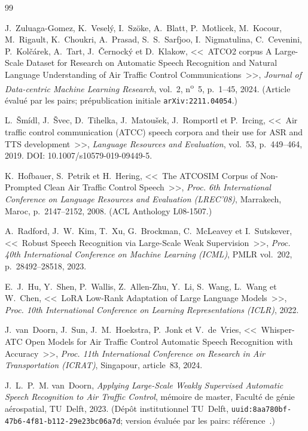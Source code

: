 \documentclass[11pt,a4paper]{article}
\newcommand{\dpt}{\char58\relax}
\begin{document}
\begin{thebibliography}{99}\small

 J.~Zuluaga-Gomez, K.~Veselý, I.~Szöke, A.~Blatt, P.~Motlicek,
M.~Kocour, M.~Rigault, K.~Choukri, A.~Prasad, S.~S.~Sarfjoo, I.~Nigmatulina,
C.~Cevenini, P.~Kolčárek, A.~Tart, J.~Černocký et D.~Klakow, <<~ATCO2 corpus\dpt{} A
Large-Scale Dataset for Research on Automatic Speech Recognition and Natural Language
Understanding of Air Traffic Control Communications~>>, \emph{Journal of Data-centric
Machine Learning Research}, vol.~2, n\textsuperscript{o}~5, p.~1--45, 2024. (Article
évalué par les pairs; prépublication initiale \texttt{arXiv:2211.04054}.)

 L.~Šmídl, J.~Švec, D.~Tihelka, J.~Matoušek, J.~Romportl et
P.~Ircing, <<~Air traffic control communication (ATCC) speech corpora and their use
for ASR and TTS development~>>, \emph{Language Resources and Evaluation}, vol.~53,
p.~449--464, 2019. DOI: 10.1007/s10579-019-09449-5.

 K.~Hofbauer, S.~Petrik et H.~Hering, <<~The ATCOSIM Corpus of
Non-Prompted Clean Air Traffic Control Speech~>>, \emph{Proc. 6th International
Conference on Language Resources and Evaluation (LREC'08)}, Marrakech, Maroc,
p.~2147--2152, 2008. (ACL Anthology L08-1507.)

 A.~Radford, J.~W.~Kim, T.~Xu, G.~Brockman, C.~McLeavey et
I.~Sutskever, <<~Robust Speech Recognition via Large-Scale Weak Supervision~>>,
\emph{Proc. 40th International Conference on Machine Learning (ICML)}, PMLR
vol.~202, p.~28492--28518, 2023.

 E.~J.~Hu, Y.~Shen, P.~Wallis, Z.~Allen-Zhu, Y.~Li, S.~Wang, L.~Wang
et W.~Chen, <<~LoRA\dpt{} Low-Rank Adaptation of Large Language Models~>>,
\emph{Proc. 10th International Conference on Learning Representations (ICLR)}, 2022.

 J.~van~Doorn, J.~Sun, J.~M.~Hoekstra, P.~Jonk et V.~de~Vries,
<<~Whisper-ATC\dpt{} Open Models for Air Traffic Control Automatic Speech Recognition with
Accuracy~>>, \emph{Proc. 11th International Conference on Research in Air
Transportation (ICRAT)}, Singapour, article~83, 2024.

 J.~L.~P.~M. van~Doorn, \emph{Applying Large-Scale Weakly
Supervised Automatic Speech Recognition to Air Traffic Control}, mémoire de master,
Faculté de génie aérospatial, TU~Delft, 2023. (Dépôt institutionnel TU~Delft,
\texttt{uuid:8aa780bf-47b6-4f81-b112-29e23bc06a7d}; version évaluée par les pairs:
référence~\cite{whisperatc}.)


\end{thebibliography}
\end{document}
